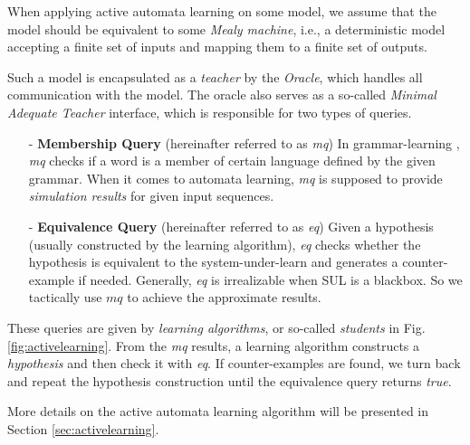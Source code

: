 \documentclass[conference, a4paper]{IEEEtran}
\begin{document}
When applying active automata learning on some model, we assume that the model should be equivalent
to some \emph{Mealy machine}, i.e., a deterministic model accepting a finite set of inputs and
mapping them to a finite set of outputs.

Such a model is encapsulated as a \emph{teacher} by the \emph{Oracle}, which handles
all communication with the model. The oracle also serves as a so-called \emph{Minimal Adequate Teacher}
interface, which is responsible for two types of queries.

\begin{itemize}
  \item[-] \textbf{Membership Query} (hereinafter referred to as \emph{mq}) In grammar-learning
    \cite{DBLP:journals/iandc/Angluin87}, \emph{mq} checks if a word is a member of certain language
    defined by the given grammar. When it comes to
    automata learning, \emph{mq} is supposed to provide \emph{simulation results} for given input
    sequences.
  \item[-] \textbf{Equivalence Query} (hereinafter referred to as \emph{eq}) Given a hypothesis
    (usually constructed by the learning algorithm), \emph{eq} checks whether the hypothesis is
    equivalent to the system-under-learn and generates a counter-example if needed. Generally,
    \emph{eq} is irrealizable when SUL is a blackbox. So we tactically use $mq$ to achieve the
    approximate results.
\end{itemize}

These queries are given by \emph{learning algorithms}, or so-called \emph{students} in Fig.
\ref{fig:activelearning}. From the \emph{mq} results, a learning algorithm constructs a
\emph{hypothesis} and then check it with \emph{eq}. If counter-examples are found, we turn back and
repeat the hypothesis construction until the equivalence query returns \emph{true}.

More details on the active automata learning algorithm will be presented in Section
\ref{sec:activelearning}.




\end{document}
